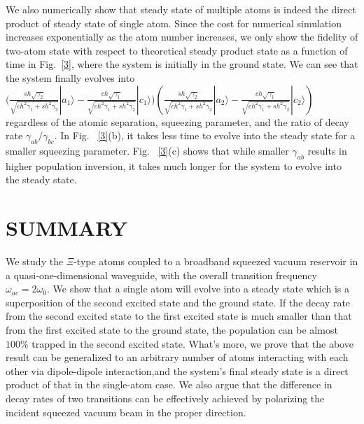 \documentclass[aps,showpacs,twocolumn,twoside,groupedaddress]{revtex4}
\begin{document}
We also numerically show that steady state of multiple atoms is indeed the direct product of steady state of single atom. Since the cost for numerical simulation increases exponentially as the atom number increases, we only show the fidelity of two-atom state with respect to theoretical steady product state as a function of time in Fig.~\ref{3}, where the system is initially in the ground state. We can see that the system finally evolves into $\ensuremath{(\frac{sh\sqrt{\gamma_{2}}}{\sqrt{ch^{2}\gamma_{1}+sh^{2}\gamma_{2}}}|a_{1}\rangle-\frac{ch\sqrt{\gamma_{1}}}{\sqrt{ch^{2}\gamma_{1}+sh^{2}\gamma_{2}}}|c_{1}\rangle})(\frac{sh\sqrt{\gamma_{2}}}{\sqrt{ch^{2}\gamma_{1}+sh^{2}\gamma_{2}}}|a_{2}\rangle-\frac{ch\sqrt{\gamma_{1}}}{\sqrt{ch^{2}\gamma_{1}+sh^{2}\gamma_{2}}}|c_{2}\rangle)$ regardless of the atomic separation, squeezing parameter, and the ratio of decay rate $\gamma_{ab}/\gamma_{bc}$. In Fig. ~\ref{3}(b), it takes less time to evolve into the steady state for a smaller squeezing parameter. Fig. ~\ref{3}(c) shows that while smaller $\gamma_{ab}$ results in higher population inversion, it takes much longer for the system to evolve into the steady state.


 
\section{SUMMARY}
We study the $\Xi$-type atoms coupled to a broadband squeezed vacuum reservoir in a quasi-one-dimensional waveguide, with the overall transition frequency $\omega_{ac}=2\omega_0$. We show that a single atom will evolve into a steady state which is a superposition of the second excited state and the ground state. If the decay rate from the second excited state to the first excited state is much smaller than that from the first excited state to the ground state, the population can be almost $100\%$ trapped in the second excited state. What's more, we prove that the above result can be generalized to an arbitrary number of atoms interacting with each other via dipole-dipole interaction,and the system's final steady state is a direct product of that in the single-atom case. We also argue that the difference in decay rates of two transitions can be effectively achieved by polarizing the incident squeezed vacuum beam in the proper direction. 
\end{document}
